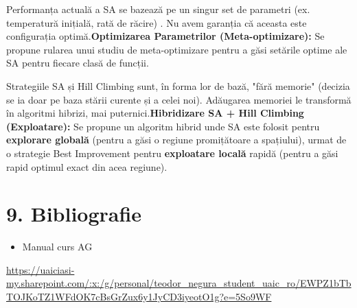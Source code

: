 \documentclass[
]{article}
\providecommand{\tightlist}{%
  \setlength{\itemsep}{0pt}\setlength{\parskip}{0pt}}
\begin{document}
Performanța actuală a SA se bazează pe un singur set de parametri (ex.
temperatură inițială, rată de răcire) . Nu avem garanția că aceasta este
configurația optimă.\textbf{Optimizarea Parametrilor (Meta-optimizare):}
Se propune rularea unui studiu de meta-optimizare pentru a găsi setările
optime ale SA pentru fiecare clasă de funcții.

Strategiile SA și Hill Climbing sunt, în forma lor de bază, "fără
memorie" (decizia se ia doar pe baza stării curente și a celei noi).
Adăugarea memoriei le transformă în algoritmi hibrizi, mai
puternici.\textbf{Hibridizare SA + Hill Climbing (Exploatare):} Se
propune un algoritm hibrid unde SA este folosit pentru \textbf{explorare
globală} (pentru a găsi o regiune promițătoare a spațiului), urmat de o
strategie Best Improvement pentru \textbf{exploatare locală} rapidă
(pentru a găsi rapid optimul exact din acea regiune).

\hypertarget{bibliografie}{%
\section{9. Bibliografie}\label{bibliografie}}

\begin{itemize}
\tightlist
\item
  Manual curs AG
\end{itemize}

\url{https://uaiciasi-my.sharepoint.com/:x:/g/personal/teodor_negura_student_uaic_ro/EWPZ1bTbTOJKoTZ1WFdOK7cBsGrZux6y1JyCD3iyeotO1g?e=5So9WF}
\end{document}
